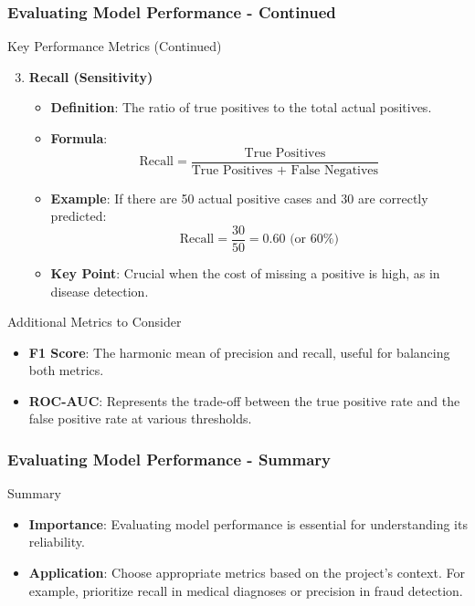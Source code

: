 \documentclass[aspectratio=169]{beamer}
\begin{document}
\begin{frame}[fragile]
    \frametitle{Evaluating Model Performance - Continued}
    \begin{block}{Key Performance Metrics (Continued)}
        \begin{enumerate}
            \setcounter{enumii}{2} %
            \item \textbf{Recall (Sensitivity)}
                \begin{itemize}
                    \item \textbf{Definition}: The ratio of true positives to the total actual positives.
                    \item \textbf{Formula}:
                    \begin{equation}
                        \text{Recall} = \frac{\text{True Positives}}{\text{True Positives + False Negatives}}
                    \end{equation}
                    \item \textbf{Example}: If there are 50 actual positive cases and 30 are correctly predicted:
                    \begin{equation}
                        \text{Recall} = \frac{30}{50} = 0.60 \text{ (or 60\%)}
                    \end{equation}
                    \item \textbf{Key Point}: Crucial when the cost of missing a positive is high, as in disease detection.
                \end{itemize}
        \end{enumerate}
    \end{block}
    \begin{block}{Additional Metrics to Consider}
        \begin{itemize}
            \item \textbf{F1 Score}: The harmonic mean of precision and recall, useful for balancing both metrics.
            \item \textbf{ROC-AUC}: Represents the trade-off between the true positive rate and the false positive rate at various thresholds.
        \end{itemize}
    \end{block}
\end{frame}

\begin{frame}[fragile]
    \frametitle{Evaluating Model Performance - Summary}
    \begin{block}{Summary}
        \begin{itemize}
            \item \textbf{Importance}: Evaluating model performance is essential for understanding its reliability.
            \item \textbf{Application}: Choose appropriate metrics based on the project's context. For example, prioritize recall in medical diagnoses or precision in fraud detection.
        \end{itemize}
    \end{block}
\end{frame}
\end{document}
